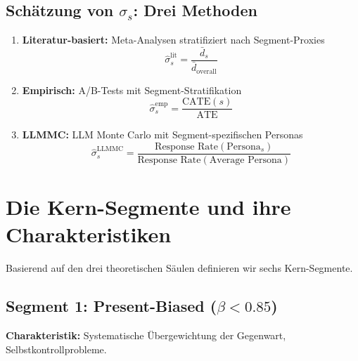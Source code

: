 \subsection{Schätzung von $\sigma_s$: Drei Methoden}

\begin{enumerate}
\item \textbf{Literatur-basiert:} Meta-Analysen stratifiziert nach Segment-Proxies
\begin{equation}
\hat{\sigma}_s^{\text{lit}} = \frac{\bar{d}_s}{\bar{d}_{\text{overall}}}
\label{eq:19-sigma-lit}
\end{equation}

\item \textbf{Empirisch:} A/B-Tests mit Segment-Stratifikation
\begin{equation}
\hat{\sigma}_s^{\text{emp}} = \frac{\text{CATE}(s)}{\text{ATE}}
\label{eq:19-sigma-emp}
\end{equation}

\item \textbf{LLMMC:} LLM Monte Carlo mit Segment-spezifischen Personas
\begin{equation}
\hat{\sigma}_s^{\text{LLMMC}} = \frac{\text{Response Rate}(\text{Persona}_s)}{\text{Response Rate}(\text{Average Persona})}
\label{eq:19-sigma-llmmc}
\end{equation}
\end{enumerate}


\section{Die Kern-Segmente und ihre Charakteristiken}
\label{sec:19-segments}

Basierend auf den drei theoretischen Säulen definieren wir sechs Kern-Segmente.

\subsection{Segment 1: Present-Biased ($\beta < 0.85$)}

\textbf{Charakteristik:} Systematische Übergewichtung der Gegenwart, Selbstkontrollprobleme.

